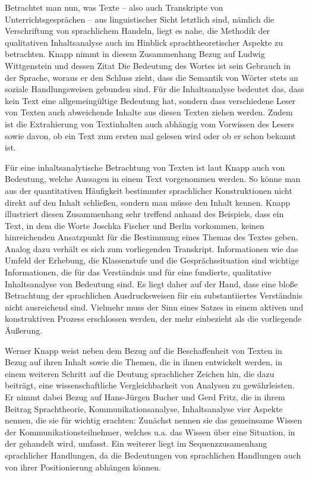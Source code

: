 Betrachtet man nun, was Texte -- also auch Transkripte von Unterrichtsgesprächen -- aus linguistischer Sicht letztlich sind, nämlich die Verschriftung von sprachlichem Handeln, liegt es nahe, die Methodik der qualitativen Inhaltsanalyse auch im Hinblick sprachtheoretischer Aspekte zu betrachten. 
Knapp nimmt in diesem Zusammenhang Bezug auf Ludwig Wittgenstein und dessen Zitat \glqq Die Bedeutung des Wortes ist sein Gebrauch in der Sprache\grqq{}\cite[S.\,21]{LW07}, woraus er den Schluss zieht, dass die Semantik von Wörter stets an soziale Handlungsweisen gebunden sind. 
Für die Inhaltsanalyse bedeutet das, dass kein Text eine allgemeingültige Bedeutung hat, sondern dass verschiedene Leser von Texten auch abweichende Inhalte aus diesen Texten ziehen werden.  
Zudem ist die Extrahierung von Textinhalten auch abhängig vom Vorwissen des Lesers sowie davon, ob ein Text zum ersten mal gelesen wird oder ob er schon bekannt ist\cite[S.\,22]{WK07}.

Für eine inhaltsanalytische Betrachtung von Texten ist laut Knapp auch von Bedeutung, welche Aussagen in einem Text vorgenommen werden. 
So könne man aus der quantitativen Häufigkeit bestimmter sprachlicher Konstruktionen nicht direkt auf den Inhalt schließen, sondern man müsse den Inhalt kennen. 
Knapp illustriert diesen Zusammenhang sehr treffend anhand des Beispiels, dass ein Text, in dem die Worte \glqq Joschka Fischer\grqq{} und Berlin vorkommen, keinen hinreichenden Ansatzpunkt für die Bestimmung eines Themas des Textes geben. 
Analog dazu verhält es sich zum vorliegenden Transkript. 
Informationen wie das Umfeld der Erhebung, die Klassenstufe und die Gesprächssituation sind wichtige Informationen, die für das Verständnis und für eine fundierte, qualitative Inhaltsanalyse von Bedeutung sind. 
Es liegt daher auf der Hand, dass eine bloße Betrachtung der sprachlichen Ausdrucksweisen für ein substantiiertes Verständnis nicht ausreichend sind. 
Vielmehr muss der Sinn eines Satzes \glqq in einem aktiven und konstruktiven Prozess erschlossen werden, der mehr einbezieht als die vorliegende Äußerung.\grqq{}\cite[S.\,28]{WK07}

Werner Knapp weist neben dem Bezug auf die Beschaffenheit von Texten in Bezug auf ihren Inhalt sowie die Themen, die in ihnen entwickelt werden, in einem weiteren Schritt auf die Deutung sprachlicher Zeichen hin, die dazu beiträgt, eine wissenschaftliche Vergleichbarkeit von Analysen zu gewährleisten. 
Er nimmt dabei Bezug auf Hans-Jürgen Bucher  und Gerd Fritz, die in ihrem Beitrag \glqq Sprachtheorie, Kommunikationsanalyse, Inhaltsanalyse\grqq{} vier Aspekte nennen, die sie für wichtig erachten: 
Zunächst nennen sie das gemeinsame Wissen der Kommunikationsteilnehmer, welches u.a. das Wissen über eine Situation, in der gehandelt wird, umfasst. 
Ein weiterer liegt im Sequenzzusamenhang sprachlicher Handlungen, da die Bedeutungen von sprachlichen Handlungen auch von ihrer Positionierung abhängen können. 

